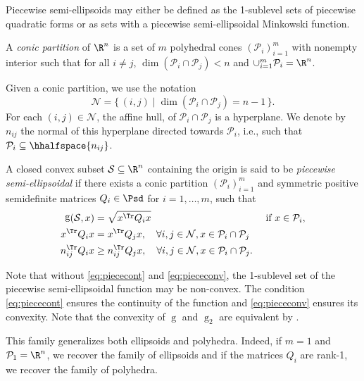 \documentclass[11pt,twoside,a4paper,openright]{uclouvain-thesis}
\DeclareMathOperator{\gauge}{g}
\begin{document}
Piecewise semi-ellipsoids may either be defined as the 1-sublevel sets of piecewise quadratic forms
or as sets with a piecewise semi-ellipsoidal Minkowski function.
\begin{mydef}
  A \emph{conic partition} of $\R^n$ is a set of $m$ polyhedral cones $(\mathcal{P}_i)_{i=1}^m$
  with nonempty interior
  such that for all $i \neq j$, $\dim(\mathcal{P}_i \cap \mathcal{P}_j) < n$
  and $\cup_{i=1}^m \mathcal{P}_i = \R^n$.
\end{mydef}
Given a conic partition, we use the notation
\begin{equation*}
  \mathcal{N} = \{\, (i, j) \mid \dim(\mathcal{P}_i \cap \mathcal{P}_j) = n - 1 \,\}.
\end{equation*}
For each $(i, j) \in \mathcal{N}$,
the affine hull, of $\mathcal{P}_i \cap \mathcal{P}_j$ is a hyperplane.
We denote by $n_{ij}$ the normal of this hyperplane directed towards $\mathcal{P}_i$,
i.e., such that $\mathcal{P}_i \subseteq \hhalfspace{n_{ij}}$.
\begin{mydef}
  \label{def:piece}
  A closed convex subset $\mathcal{S} \subseteq \R^n$ containing the origin is said to be \emph{piecewise semi-ellipsoidal} if there exists
  a conic partition $(\mathcal{P}_i)_{i=1}^m$
  and symmetric positive semidefinite matrices $Q_i \in \Psd$ for $i = 1, \ldots, m$,
  such that
  \begin{align}
    \notag
    \gauge(\mathcal{S}, x) & =
      \sqrt{x^\Tr Q_i x} & \text{ if } x \in \mathcal{P}_i,
    \\
    \label{eq:piececont}
    x^\Tr Q_i x & = x^\Tr Q_j x, \quad \forall i, j \in \mathcal{N}, x \in \mathcal{P}_i \cap \mathcal{P}_j\\
    \label{eq:piececonv}
    n_{ij}^\Tr Q_i x & \ge n_{ij}^\Tr Q_j x, \quad \forall i, j \in \mathcal{N}, x \in \mathcal{P}_i \cap \mathcal{P}_j.
  \end{align}
\end{mydef}
Note that without \eqref{eq:piececont} and \eqref{eq:piececonv}, the 1-sublevel set of
the piecewise semi-ellipsoidal function may be non-convex.
The condition \eqref{eq:piececont} ensures the continuity of the function
and \eqref{eq:piececonv} ensures its convexity.
Note that the convexity of $\gauge$ and $\gauge_{2}$ are equivalent by \cite[Corollary~15.3.1]{rockafellar2015convex}.

This family generalizes both ellipsoids and polyhedra.
Indeed, if $m = 1$ and $\mathcal{P}_1 = \R^n$, we recover the family of ellipsoids and
if the matrices $Q_i$ are rank-1, we recover the family of polyhedra.
\end{document}
